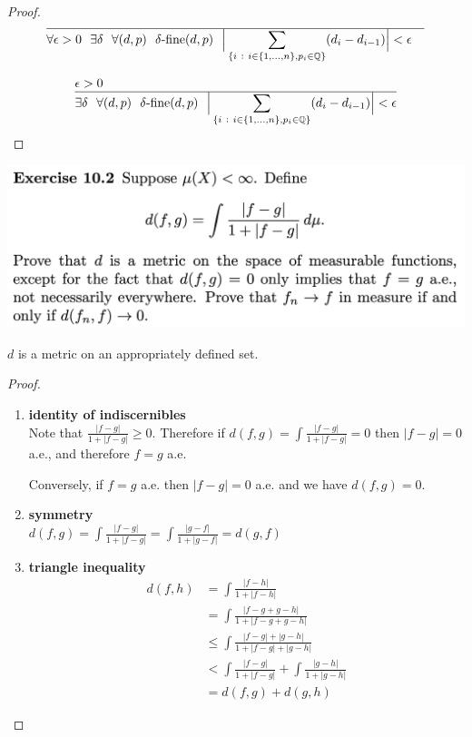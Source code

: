 \begin{proof}
  \begin{align*}
    \hline
    &\forall \epsilon > 0 ~~ \exists \delta ~~ \forall (d, p) ~~ \delta\text{-fine}(d, p) ~~ \Big|\sum_{\{i ~:~ i \in \{1, \ldots, n\}, p_i \in \mathbb{Q}\}} (d_i - d_{i-1})\Big| < \epsilon
  \end{align*}

\begin{align*}
  &\epsilon > 0 \\
  \hline
  &\exists \delta ~~ \forall (d, p) ~~ \delta\text{-fine}(d, p) ~~ \Big|\sum_{\{i ~:~ i \in \{1, \ldots, n\}, p_i \in \mathbb{Q}\}} (d_i - d_{i-1})\Big| < \epsilon
  \end{align*}
\end{proof}
\newpage
\begin{mdframed}
\includegraphics[width=400pt]{img/analysis--berkeley-202a-hw09-b4e1.png}
\end{mdframed}

\begin{claim*}
  $d$ is a metric on an appropriately defined set.
\end{claim*}

\begin{proof}
  \begin{enumerate}
  \item {\bf identity of indiscernibles}\\
    Note that $\frac{|f - g|}{1 + |f - g|} \geq 0$. Therefore
    if $d(f, g) = \int\frac{|f - g|}{1 + |f - g|} = 0$ then $|f - g| = 0$ a.e., and therefore $f = g$ a.e.

    Conversely, if $f = g$ a.e. then $|f - g| = 0$ a.e. and we have $d(f, g) = 0$.

  \item {\bf symmetry}\\
    $d(f, g) = \int \frac{|f - g|}{1 + |f - g|} = \int \frac{|g - f|}{1 + |g - f|} = d(g, f)$

  \item {\bf triangle inequality}
    \begin{align*}
      d(f, h)
      &= \int \frac{|f - h|}{1 + |f - h|} \\
      &= \int \frac{|f - g + g - h|}{1 + |f - g + g - h|} \\
      &\leq \int \frac{|f - g| + |g - h|}{1 + |f - g| + |g - h|} \\
      &< \int \frac{|f - g|}{1 + |f - g|} + \int \frac{|g - h|}{1 + |g - h|} \\
      &= d(f, g) + d(g, h)
    \end{align*}
  \end{enumerate}
\end{proof}


